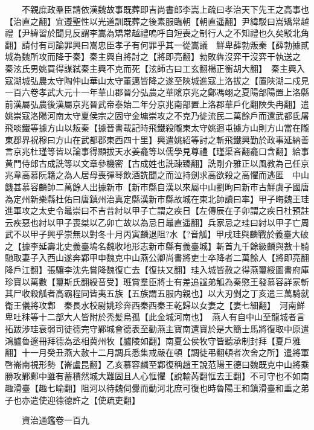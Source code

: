 　　不親庶政羣臣請依漢魏故事既葬即吉尚書郎李嵩上疏曰孝治天下先王之高事也【治直之翻】宜遵聖性以光道訓既葬之後素服臨朝【朝直遥翻】尹緯駁曰嵩矯常越禮【尹緯習於聞見反謂李嵩為矯常越禮嗚呼自短喪之制行人之不知禮也久矣駁北角翻】請付有司論罪興曰嵩忠臣孝子有何罪乎其一從嵩議　鮮卑薛勃叛秦【薛勃據貳城為魏所攻而降于秦】秦主興自將討之【將即亮翻】勃敗犇沒弈干沒弈干執送之　秦泫氏男姚買得謀弑秦主興不克而死【泫師古曰工玄翻楊正衡胡大翻】　秦主興入寇湖城弘農太守陶仲山華山太守董邁皆降之遂至陜城進寇上洛拔之【置陜湖二戍見一百六卷孝武大元十一年華山郡晉分弘農之華隂京兆之鄭馮翊之夏陽郃陽置上洛縣前漢屬弘農後漢屬京兆晉武帝泰始二年分京兆南部置上洛郡華戶化翻陜失冉翻】遣姚崇寇洛陽河南太守夏侯宗之固守金墉崇攻之不克乃徙流民二萬餘戶而還武都氐屠飛啖鐵等據方山以叛秦【據晉書載記時飛鐵殺隴東太守姚迴屯據方山則方山當在隴東郡界祝穆曰方山在武都郡東西四十里】興遣姚紹等討之斬飛鐵興勤於政事延納善言京兆杜瑾等皆以論事得顯拔天水姜龕等以儒學見尊禮【瑾渠吝翻龕口含翻】給事黄門侍郎古成詵等以文章參機密【古成姓也詵疎臻翻】詵剛介雅正以風教為己任京兆韋高慕阮籍之為人居母喪彈琴飲酒詵聞之而泣持劍求高欲殺之高懼而逃匿　中山饑甚慕容麟帥二萬餘人出據新市【新市縣自漢以來屬中山劉昫曰新市古鮮虞子國唐為定州新樂縣杜佑曰唐鎮州治真定縣漢新市縣故城在東北帥讀曰率】甲子晦魏王珪進軍攻之太史令鼂崇曰不吉昔紂以甲子亡謂之疾日【左傳辰在子卯謂之疾日杜預註云疾惡也紂以甲子喪桀以乙卯亡故以為忌日鼂直遥翻】兵家忌之珪曰紂以甲子亡周武不以甲子興乎崇無以對冬十月丙寅麟退阻?水【?音觚】甲戌珪與麟戰於義臺大破之【據李延壽北史義臺塢名魏收地形志新市縣有義臺城】斬首九千餘級麟與數十騎馳取妻子入西山遂奔鄴甲申魏克中山燕公卿尚書將吏士卒降者二萬餘人【將即亮翻降戶江翻】張驤李沈先嘗降魏復亡去【復扶又翻】珪入城皆赦之得燕璽綬圖書府庫珍寶以萬數【璽斯氏翻綬音受】班賞羣臣將士有差追諡弟觚為秦愍王發慕容詳冡斬其尸收殺觚者高霸程同皆夷五族【五族謂五服内親也】以大刃剉之丁亥遣三萬騎就衛王儀將攻鄴　秦長水校尉姚珍奔西秦西秦王乾歸以女妻之【妻七細翻】　河南鮮卑吐秣等十二部大人皆附於秃髪烏孤【此金城河南也】　燕人有自中山至龍城者言拓跋涉珪衰弱司徒德完守鄴城會德表至勸燕主寶南還寶於是大簡士馬將復取中原遣鴻臚魯邃冊拜德為丞相冀州牧【臚陵如翻】南夏公侯牧守皆聽承制封拜【夏戶雅翻】十一月癸丑燕大赦十二月調兵悉集戒嚴在頓【調徒弔翻頓者次舍之所】遣將軍啓崙南視形勢【崙盧昆翻】乙亥慕容麟至鄴復稱趙王說范陽王德曰魏既克中山將乘勝攻鄴鄴中雖有蓄積然城大難固且人心恇懼【說輸芮翻恇去王翻】不可守也不如南趣滑臺【趣七喻翻】阻河以待魏伺釁而動河北庶可復也時魯陽王和鎮滑臺和垂之弟子也亦遣使迎德德許之【使疏吏翻】

　　資治通鑑卷一百九  
    


 


